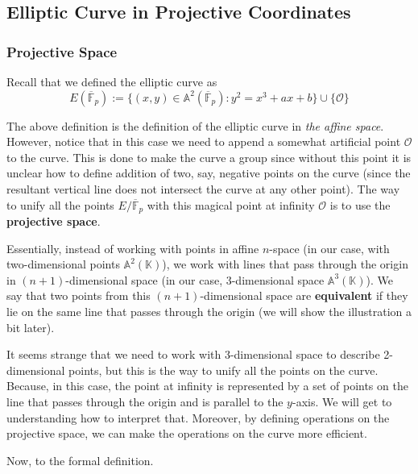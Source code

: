 \documentclass[../lecture-notes-148x210.tex]{subfiles}
\begin{document}
\subsection{Elliptic Curve in Projective Coordinates}

\subsubsection{Projective Space}

Recall that we defined the elliptic curve as 
\begin{equation*}
    E(\overline{\mathbb{F}}_p) := \{(x,y) \in \mathbb{A}^2(\overline{\mathbb{F}}_p): y^2 = x^3+ax+b\} \cup \{\mathcal{O}\}
\end{equation*}

The above definition is the definition of the elliptic curve in \textit{the affine space}. However, notice that in this case 
we need to append a somewhat artificial point $\mathcal{O}$ to the curve. This is done to make the curve a group since without 
this point it is unclear how to define addition of two, say, negative points on the curve (since the resultant vertical line
does not intersect the curve at any other point). The way to unify all the points $E/\overline{\mathbb{F}}_p$ with this 
magical point at infinity $\mathcal{O}$ is to use the \textbf{projective space}.

Essentially, instead of working with points in affine $n$-space (in our case, with two-dimensional points $\mathbb{A}^2(\mathbb{K})$), we work with lines that pass through the origin in 
$(n+1)$-dimensional space (in our case, 3-dimensional space $\mathbb{A}^3(\mathbb{K})$). We say that two points from this $(n+1)$-dimensional space are \textbf{equivalent} if they lie on the same line that passes through the origin (we will show the illustration a bit later). 

It seems strange that we need to work with 3-dimensional space to describe 2-dimensional points, but this is the way to unify all the points on the curve. Because, in this case, the point at infinity is represented by a set of points on the line that passes through the origin and is parallel to the
$y$-axis. We will get to understanding how to interpret that. Moreover, by defining operations on the projective space, we can make the operations on the curve more efficient.

Now, to the formal definition.
\end{document}
